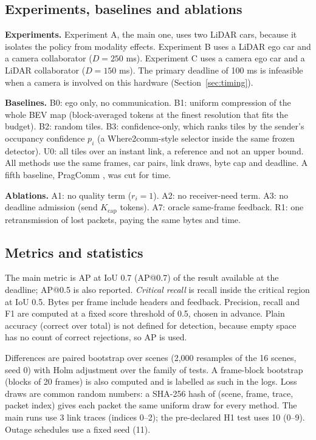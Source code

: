 \documentclass[conference]{IEEEtran}
\begin{document}
\subsection{Experiments, baselines and ablations}
\textbf{Experiments.} Experiment A, the main one, uses two LiDAR cars, because it isolates the policy from modality effects. Experiment B uses a LiDAR ego car and a camera collaborator ($D=250$ ms). Experiment C uses a camera ego car and a LiDAR collaborator ($D=150$ ms). The primary deadline of 100 ms is infeasible when a camera is involved on this hardware (Section~\ref{sec:timing}).

\textbf{Baselines.} B0: ego only, no communication. B1: uniform compression of the whole BEV map (block-averaged tokens at the finest resolution that fits the budget). B2: random tiles. B3: confidence-only, which ranks tiles by the sender's occupancy confidence $p_i$ (a Where2comm-style selector inside the same frozen detector). U0: all tiles over an instant link, a reference and not an upper bound. All methods use the same frames, car pairs, link draws, byte cap and deadline. A fifth baseline, PragComm \cite{hu2026prag}, was cut for time.

\textbf{Ablations.} A1: no quality term ($r_i=1$). A2: no receiver-need term. A3: no deadline admission (send $K_{\mathrm{cap}}$ tokens). A7: oracle same-frame feedback. R1: one retransmission of lost packets, paying the same bytes and time.

\subsection{Metrics and statistics}
The main metric is AP at IoU 0.7 (AP@0.7) of the result available at the deadline; AP@0.5 is also reported. \emph{Critical recall} is recall inside the critical region at IoU 0.5. Bytes per frame include headers and feedback. Precision, recall and F1 are computed at a fixed score threshold of 0.5, chosen in advance. Plain accuracy (correct over total) is not defined for detection, because empty space has no count of correct rejections, so AP is used.

Differences are paired bootstrap over scenes (2,000 resamples of the 16 scenes, seed 0) with Holm adjustment over the family of tests. A frame-block bootstrap (blocks of 20 frames) is also computed and is labelled as such in the logs. Loss draws are common random numbers: a SHA-256 hash of (scene, frame, trace, packet index) gives each packet the same uniform draw for every method. The main runs use 3 link traces (indices 0--2); the pre-declared H1 test uses 10 (0--9). Outage schedules use a fixed seed (11).
\end{document}
